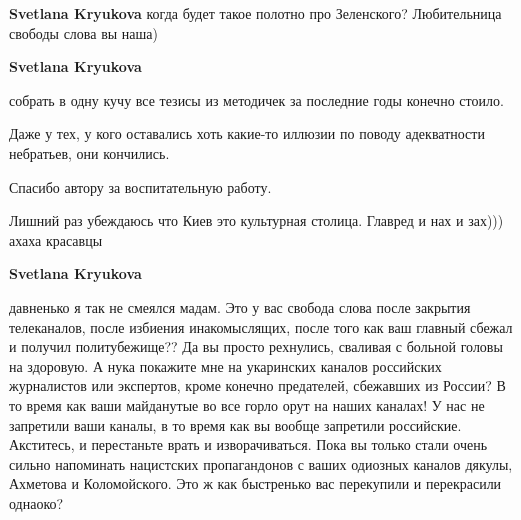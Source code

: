 \begin{itemize}
\begin{itemize}
\textbf{Svetlana Kryukova} когда будет такое полотно про Зеленского? Любительница свободы слова вы наша)

 
\textbf{Svetlana Kryukova} 

собрать в одну кучу все тезисы из методичек за последние годы конечно стоило.

Даже у тех, у кого оставались хоть какие-то иллюзии по поводу адекватности
небратьев, они кончились.

Спасибо автору за воспитательную работу.


 

Лишний раз убеждаюсь что Киев это культурная столица. Главред и нах и зах)))
ахаха красавцы


 
\textbf{Svetlana Kryukova} 

давненько я так не смеялся мадам. Это у вас свобода слова после закрытия
телеканалов, после избиения инакомыслящих, после того как ваш главный сбежал и
получил политубежище?? Да вы просто рехнулись, сваливая с больной головы на
здоровую. А нука покажите мне на укаринских каналов российских журналистов или
экспертов, кроме конечно предателей, сбежавших из России? В то время как ваши
майданутые во все горло орут на наших каналах! У нас не запретили ваши каналы,
в то время как вы вообще запретили российские. Акститесь, и перестаньте врать и
изворачиваться. Пока вы только стали очень сильно напоминать нацистских
пропагандонов с ваших одиозных каналов дякулы, Ахметова и Коломойского. Это ж
как быстренько вас перекупили и перекрасили однаоко?

 

\end{itemize}
\end{itemize}

